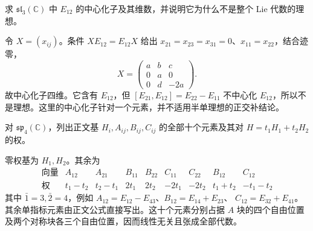 \begin{exercise}\label{b5:ex:13-sl3-centralizer}
	求 \(\mathfrak{sl}_3(\mathbb C)\) 中 \(E_{12}\) 的中心化子及其维数，并说明它为什么不是整个 Lie 代数的理想。
\end{exercise}
\begin{solution}
	令 \(X=(x_{ij})\)。条件 \(XE_{12}=E_{12}X\) 给出 \(x_{21}=x_{23}=x_{31}=0\)、\(x_{11}=x_{22}\)，结合迹零，
	\[
		X=\begin{pmatrix}a&b&c\\0&a&0\\0&d&-2a\end{pmatrix}.
	\]
	故中心化子四维。它含有 \(E_{12}\)，但 \([E_{21},E_{12}]=E_{22}-E_{11}\) 不中心化 \(E_{12}\)，所以不是理想。这里的中心化子针对一个元素，并不适用半单理想的正交补结论。
\end{solution}

\begin{exercise}\label{b5:ex:13-sp4-basis}
	对 \(\mathfrak{sp}_4(\mathbb C)\)，列出正文基 \(H_i,A_{ij},B_{ij},C_{ij}\) 的全部十个元素及其对 \(H=t_1H_1+t_2H_2\) 的权。
\end{exercise}
\begin{solution}
	零权基为 \(H_1,H_2\)。其余为
	\[
		\begin{array}{c|cccccccc}
			\text{向量}&A_{12}&A_{21}&B_{11}&B_{22}&C_{11}&C_{22}&B_{12}&C_{12}\\
			\hline
			\text{权}&t_1-t_2&t_2-t_1&2t_1&2t_2&-2t_1&-2t_2&t_1+t_2&-t_1-t_2
		\end{array}
	\]
	其中 \(\bar1=3,\bar2=4\)，例如 \(A_{12}=E_{12}-E_{43}\)、\(B_{12}=E_{14}+E_{23}\)、 \(C_{12}=E_{32}+E_{41}\)。其余单指标元素由正文公式直接写出。这十个元素分别占据 \(A\) 块的四个自由位置及两个对称块各三个自由位置，因而线性无关且张成全部代数。
\end{solution}

